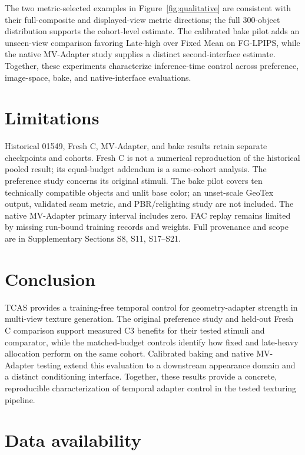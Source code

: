 \documentclass[times,twocolumn,final]{elsarticle}
\providecommand{\DIFadd}[1]{{\protect\color{blue} \sf #1}} %
\providecommand{\DIFaddbegin}{} %
\providecommand{\DIFaddend}{} %
\begin{document}
  \DIFaddbegin \DIFadd{The two metric-selected examples in Figure~\ref{fig:qualitative} are consistent with their full-composite and displayed-view metric directions; the full 300-object distribution supports the cohort-level estimate. The calibrated bake pilot adds an unseen-view comparison favoring Late-high over Fixed Mean on FG-LPIPS, while the native MV-Adapter study supplies a distinct second-interface estimate. Together, these experiments characterize inference-time control across preference, image-space, bake, and native-interface evaluations.
}

\section{Limitations}
\label{sec:limitations}
\DIFadd{Historical 01549, Fresh C, MV-Adapter, and bake results retain separate checkpoints and cohorts. Fresh C is not a numerical reproduction of the historical pooled result; its equal-budget addendum is a same-cohort analysis. The preference study concerns its original stimuli. The bake pilot covers ten technically compatible objects and unlit base color; an unset-scale GeoTex output, validated seam metric, and PBR/relighting study are not included. The native MV-Adapter primary interval includes zero. FAC replay remains limited by missing run-bound training records and weights. Full provenance and scope are in Supplementary Sections S8, S11, S17--S21}\DIFaddend .

\section{Conclusion}
\label{sec:conclusion}
 
 \DIFaddbegin \DIFadd{TCAS provides a training-free temporal control for geometry-adapter strength }\DIFaddend in multi-view   texture generation. The   \DIFaddbegin \DIFadd{original preference study and held-out Fresh C comparison support measured C3 benefits for their tested stimuli and comparator, while the matched-budget controls identify how fixed and late-heavy allocation perform on the same cohort. Calibrated baking and native MV-Adapter testing extend this evaluation to a downstream appearance domain and a distinct conditioning interface. Together, these results provide a concrete, reproducible characterization of temporal adapter control in the tested texturing pipeline}\DIFaddend .

  \DIFaddbegin \section*{\DIFadd{Data availability}}
\DIFaddend 
\end{document}
